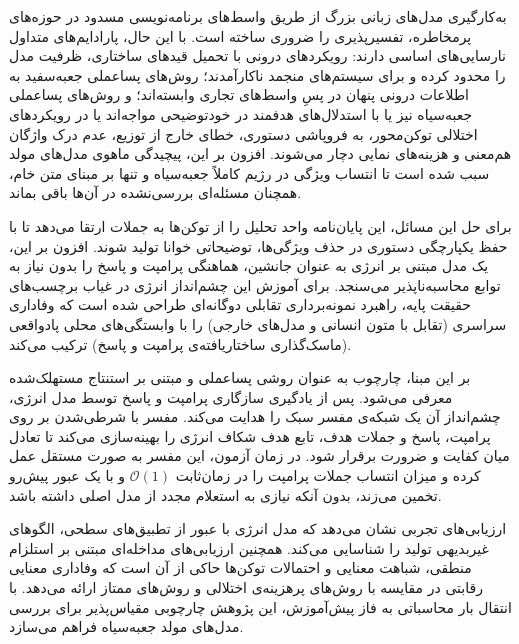 \begin{persianabstract}
به‌کارگیری مدل‌های زبانی بزرگ از طریق واسط‌های برنامه‌نویسی مسدود در حوزه‌های پرمخاطره، تفسیرپذیری را ضروری ساخته است. با این حال، پارادایم‌های متداول نارسایی‌های اساسی دارند: رویکردهای درونی با تحمیل قیدهای ساختاری، ظرفیت مدل را محدود کرده و برای سیستم‌های منجمد ناکارآمدند؛ روش‌های پساعملی جعبه‌سفید به اطلاعات درونی پنهان در پسِ واسط‌های تجاری وابسته‌اند؛ و روش‌های پساعملی جعبه‌سیاه نیز یا با استدلال‌های هدفمند در خودتوضیحی مواجه‌اند یا در رویکردهای اختلالی توکن‌محور، به فروپاشی دستوری، خطای خارج از توزیع، عدم درک واژگان هم‌معنی و هزینه‌های نمایی دچار می‌شوند. افزون بر این، پیچیدگی ماهوی مدل‌های مولد سبب شده است تا انتساب ویژگی در رژیم کاملاً جعبه‌سیاه و تنها بر مبنای متن خام، همچنان مسئله‌ای بررسی‌نشده در آن‌ها باقی بماند.

برای حل این مسائل، این پایان‌نامه واحد تحلیل را از توکن‌ها به جملات ارتقا می‌دهد تا با حفظ یکپارچگی دستوری در حذف ویژگی‌ها، توضیحاتی خوانا تولید شوند. افزون بر این، یک مدل مبتنی بر انرژی به عنوان جانشین، هماهنگی پرامپت و پاسخ را بدون نیاز به توابع محاسبه‌ناپذیر می‌سنجد. برای آموزش این چشم‌انداز انرژی در غیاب برچسب‌های حقیقت پایه، راهبرد نمونه‌برداری تقابلی دوگانه‌ای طراحی شده است که وفاداری سراسری (تقابل با متون انسانی و مدل‌های خارجی) را با وابستگی‌های محلی پادواقعی (ماسک‌گذاری ساختاریافته‌ی پرامپت و پاسخ) ترکیب می‌کند.

بر این مبنا، چارچوب  به عنوان روشی پساعملی و مبتنی بر استنتاج مستهلک‌شده معرفی می‌شود. پس از یادگیری سازگاری پرامپت و پاسخ توسط مدل انرژی، چشم‌انداز آن یک شبکه‌ی مفسر سبک را هدایت می‌کند. مفسر با شرطی‌شدن بر روی پرامپت، پاسخ و جملات هدف، تابع هدف شکاف انرژی را بهینه‌سازی می‌کند تا تعادل میان کفایت و ضرورت برقرار شود. در زمان آزمون، این مفسر به صورت مستقل عمل کرده و میزان انتساب جملات پرامپت را در زمان‌ثابت $\mathcal{O}(1)$ و با یک عبور پیش‌رو تخمین می‌زند، بدون آنکه نیازی به استعلام مجدد از مدل اصلی داشته باشد.

ارزیابی‌های تجربی نشان می‌دهد که مدل انرژی با عبور از تطبیق‌های سطحی، الگوهای غیربدیهی تولید را شناسایی می‌کند. همچنین ارزیابی‌های مداخله‌ای مبتنی بر استلزام منطقی، شباهت معنایی و احتمالات توکن‌ها حاکی از آن است که  وفاداری معنایی رقابتی در مقایسه با روش‌های پرهزینه‌ی اختلالی و روش‌های ممتاز ارائه می‌دهد. با انتقال بار محاسباتی به فاز پیش‌آموزش، این پژوهش چارچوبی مقیاس‌پذیر برای بررسی مدل‌های مولد جعبه‌سیاه فراهم می‌سازد.

\end{persianabstract}
